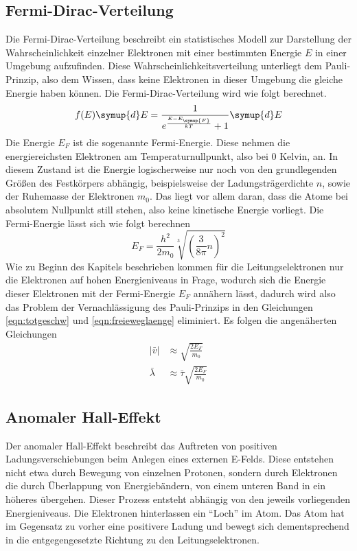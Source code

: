 \subsection{Fermi-Dirac-Verteilung}
\label{sec:fermidirac}
Die Fermi-Dirac-Verteilung beschreibt ein statistisches Modell zur Darstellung der Wahrscheinlichkeit einzelner Elektronen mit einer bestimmten Energie $E$
in einer Umgebung aufzufinden. Diese Wahrscheinlichkeitsverteilung unterliegt dem Pauli-Prinzip, also dem Wissen, dass keine Elektronen in dieser Umgebung die gleiche Energie haben können.
Die Fermi-Dirac-Verteilung wird wie folgt berechnet.
\begin{equation}
\label{eqn:fermidiraceq}
f(E)\symup{d}E = \frac{1}{e^{\frac{E-E_{\symup{F}}}{kT}}+1} \symup{d}E
\end{equation}
Die Energie $E_{F}$ ist die sogenannte Fermi-Energie. Diese nehmen die energiereichsten Elektronen am Temperaturnullpunkt, also bei 0 Kelvin, an. 
In diesem Zustand ist die Energie logischerweise nur noch von den grundlegenden Größen des Festkörpers abhängig, beispielsweise der Ladungsträgerdichte $n$, sowie der Ruhemasse der Elektronen $m_{0}$.
Das liegt vor allem daran, dass die Atome bei absolutem Nullpunkt still stehen, also keine kinetische Energie vorliegt.
Die Fermi-Energie lässt sich wie folgt berechnen
\begin{equation}
\label{eqn:fermienergie}
E_{F} = \frac{h^{2}}{2 m_{0}} \sqrt[3]{\left( \frac{3}{8\pi} n \right)^{2}}
\end{equation}
Wie zu Beginn des Kapitels beschrieben kommen für die Leitungselektronen nur die Elektronen auf hohen Energieniveaus in Frage, wodurch sich die Energie dieser Elektronen
mit der Fermi-Energie $E_{F}$ annähern lässt, dadurch wird also das Problem der Vernachlässigung des Pauli-Prinzips in den Gleichungen \eqref{eqn:totgeschw} und \eqref{eqn:freieweglaenge} eliminiert.
Es folgen die angenäherten Gleichungen
\begin{align}
\label{eqn:totalgeschw}
\lvert \bar{v} \rvert &\approx \sqrt{\frac{2 E_{F}}{m_{0}}} \\
\label{eqn:mittfreierweg}
\bar{\lambda} &\approx \bar{\tau} \sqrt{\frac{2 E_{F}}{m_{0}}}
\end{align}

\subsection{Anomaler Hall-Effekt}
\label{sec:anomhall}
Der anomaler Hall-Effekt beschreibt das Auftreten von positiven Ladungsverschiebungen beim Anlegen eines externen E-Felds. Diese entstehen nicht etwa durch Bewegung von einzelnen Protonen, sondern durch Elektronen
die durch Überlappung von Energiebändern, von einem unteren Band in ein höheres übergehen. Dieser Prozess entsteht abhängig von den jeweils vorliegenden Energieniveaus.
Die Elektronen hinterlassen ein \enquote{Loch} im Atom. Das Atom hat im Gegensatz zu vorher eine positivere Ladung und bewegt sich dementsprechend in die entgegengesetzte Richtung zu den Leitungselektronen.